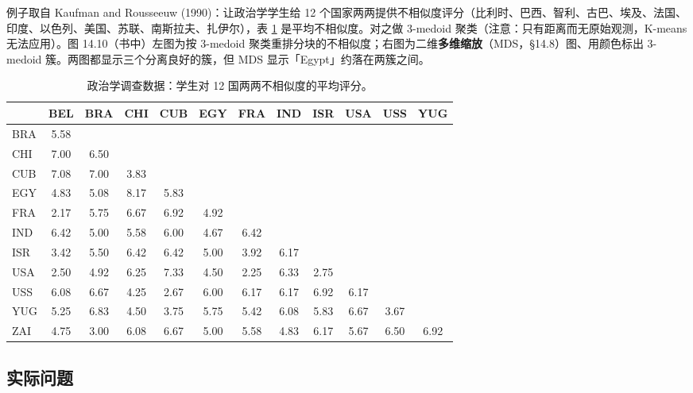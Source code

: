 \begin{example}
例子取自 Kaufman and Rousseeuw (1990)：让政治学学生给 12 个国家两两提供不相似度评分（比利时、巴西、智利、古巴、埃及、法国、印度、以色列、美国、苏联、南斯拉夫、扎伊尔），表 \ref{tab:14_3} 是平均不相似度。对之做 3-medoid 聚类（注意：只有距离而无原始观测，K-means 无法应用）。图 14.10（书中）左图为按 3-medoid 聚类重排分块的不相似度；右图为二维\textbf{多维缩放}（MDS，§14.8）图、用颜色标出 3-medoid 簇。两图都显示三个分离良好的簇，但 MDS 显示「Egypt」约落在两簇之间。
\end{example}

\begin{table}[htbp]
\centering
\caption{政治学调查数据：学生对 12 国两两不相似度的平均评分。}
\label{tab:14_3}
\begin{footnotesize}
\begin{tabular}{lccccccccccc}
\toprule
 & BEL & BRA & CHI & CUB & EGY & FRA & IND & ISR & USA & USS & YUG \\
\midrule
BRA & 5.58 & & & & & & & & & & \\
CHI & 7.00 & 6.50 & & & & & & & & & \\
CUB & 7.08 & 7.00 & 3.83 & & & & & & & & \\
EGY & 4.83 & 5.08 & 8.17 & 5.83 & & & & & & & \\
FRA & 2.17 & 5.75 & 6.67 & 6.92 & 4.92 & & & & & & \\
IND & 6.42 & 5.00 & 5.58 & 6.00 & 4.67 & 6.42 & & & & & \\
ISR & 3.42 & 5.50 & 6.42 & 6.42 & 5.00 & 3.92 & 6.17 & & & & \\
USA & 2.50 & 4.92 & 6.25 & 7.33 & 4.50 & 2.25 & 6.33 & 2.75 & & & \\
USS & 6.08 & 6.67 & 4.25 & 2.67 & 6.00 & 6.17 & 6.17 & 6.92 & 6.17 & & \\
YUG & 5.25 & 6.83 & 4.50 & 3.75 & 5.75 & 5.42 & 6.08 & 5.83 & 6.67 & 3.67 & \\
ZAI & 4.75 & 3.00 & 6.08 & 6.67 & 5.00 & 5.58 & 4.83 & 6.17 & 5.67 & 6.50 & 6.92 \\
\bottomrule
\end{tabular}
\end{footnotesize}
\end{table}

\subsection{实际问题}

